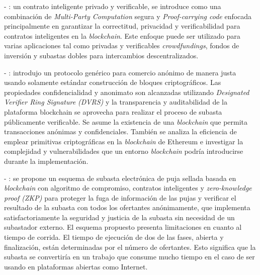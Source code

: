     - \cite{sanchez2020}: un contrato inteligente privado y verificable, se introduce como una combinación de \textit{Multi-Party 
    Computation} segura y \textit{Proof-carrying code} enfocada principalmente en garantizar la correctitud, privacidad y 
    verificabilidad para contratos inteligentes en la \textit{blockchain}. Este enfoque puede ser utilizado para varias aplicaciones tal
    como privadas y verificables \textit{crowdfundings}, fondos de inversión y subastas dobles para intercambios descentralizados. 


    - \cite{sharma2021}: introdujo un protocolo genérico para comercio anónimo de manera justa usando solamente estándar construcción de
    bloques criptográficos. Las propiedades confidencialidad y anonimato son alcanzadas utilizando \textit{Designated Verifier Ring
    Signature (DVRS)} y la transparencia y auditabilidad de la plataforma blockchain se aprovecha para realizar el proceso de subasta
    públicamente verificable. Se asume la existencia de una \textit{blockchain} que permita transacciones anónimas y confidenciales.
    También se analiza la eficiencia de emplear primitivas criptográficas en la \textit{blockchain} de Ethereum e investigar la complejidad
    y vulnerabilidades que un entorno \textit{blockchain} podría introducirse durante la implementación.


    - \cite{li2021}: se propone un esquema de subasta electrónica de puja sellada basada en \textit{blockchain} con algoritmo de 
    compromiso, contratos inteligentes y \textit{zero-knowledge proof (ZKP)} para proteger la fuga de información de las pujas y verificar
    el resultado de la subasta con todos los ofertantes anónimamente, que implementa satisfactoriamente la seguridad y justicia de la 
    subasta sin necesidad de un subastador externo. El esquema propuesto presenta limitaciones en cuanto al tiempo de corrida. El tiempo 
    de  ejecución de dos de las fases, abierta y finalización, están determinadas por el número de ofertantes. Esto significa que 
    la subasta se convertiría en un trabajo que consume mucho tiempo en el caso de ser usando en plataformas abiertas como Internet.


